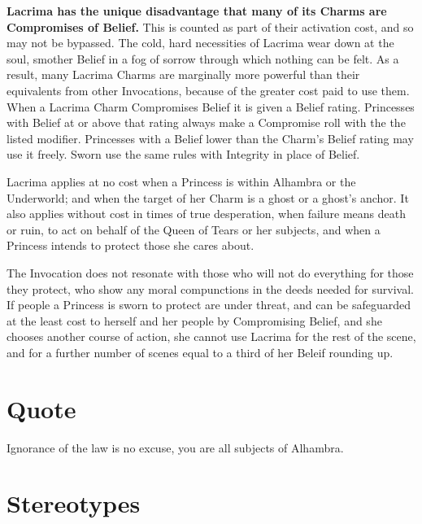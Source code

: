 \textbf{Lacrima has the unique disadvantage that many of its Charms are Compromises of Belief.} This is counted as part of their activation cost, and so may not be bypassed. The cold, hard necessities of Lacrima wear down at the soul, smother Belief in a fog of sorrow through which nothing can be felt. As a result, many Lacrima Charms are marginally more powerful than their equivalents from other Invocations, because of the greater cost paid to use them. When a Lacrima Charm Compromises Belief it is given a Belief rating. Princesses with Belief at or above that rating always make a Compromise roll with the the listed modifier. Princesses with a Belief lower than the Charm's Belief rating may use it freely. Sworn use the same rules with Integrity in place of Belief.

Lacrima applies at no cost when a Princess is within Alhambra or the Underworld; and when the target of her Charm is a ghost or a ghost's anchor. It also applies without cost in times of true desperation, when failure means death or ruin, to act on behalf of the Queen of Tears or her subjects, and when a Princess intends to protect those she cares about.

The Invocation does not resonate with those who will not do everything for those they protect, who show any moral compunctions in the deeds needed for survival. If people a Princess is sworn to protect are under threat, and can be safeguarded at the least cost to herself and her people by Compromising Belief, and she chooses another course of action, she cannot use Lacrima for the rest of the scene, and for a further number of scenes equal to a third of her Beleif rounding up.

\section*{Quote}

Ignorance of the law is no excuse, you are all subjects of Alhambra. 

\section*{Stereotypes}

